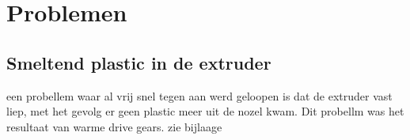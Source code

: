 \chapter{Problemen}
\label{Problemen}

\section{Smeltend plastic in de extruder}

een probellem waar al vrij snel tegen aan werd geloopen is dat de extruder vast
liep, met het gevolg er geen plastic meer uit de nozel kwam. Dit probellm was het resultaat van warme drive gears. zie bijlaage 


